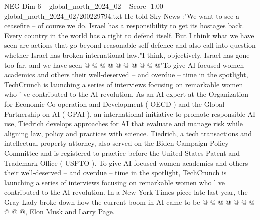 \begin{textsample}{NEG Dim 6 – global\_north\_2024\_02 – Score -1.00 – global\_north\_2024\_02/200229794.txt}
He told Sky News :"We want to see a ceasefire -- of course we do.
Israel has a responsibility to get its hostages back.
Every country in the world has a right to defend itself.
But I think what we have seen are actions that go beyond reasonable self-defence and also call into question whether Israel has broken international law."I think, objectively, Israel has gone too far, and we have seen @ @ @ @ @ @ @ @ @ @"To give AI-focused women academics and others their well-deserved -- and overdue -- time in the spotlight, TechCrunch is launching a series of interviews focusing on remarkable women who ' ve contributed to the AI revolution.
As an AI expert at the Organization for Economic Co-operation and Development ( OECD ) and the Global Partnership on AI ( GPAI ), an international initiative to promote responsible AI use, Tiedrich develops approaches for AI that evaluate and manage risk while aligning law, policy and practices with science.
Tiedrich, a tech transactions and intellectual property attorney, also served on the Biden Campaign Policy Committee and is registered to practice before the United States Patent and Trademark Office ( USPTO ).
To give AI-focused women academics and others their well-deserved -- and overdue -- time in the spotlight, TechCrunch is launching a series of interviews focusing on remarkable women who ' ve contributed to the AI revolution.
In a New York Times piece late last year, the Gray Lady broke down how the current boom in AI came to be @ @ @ @ @ @ @ @ @ @, Elon Musk and Larry Page.

\end{textsample}
